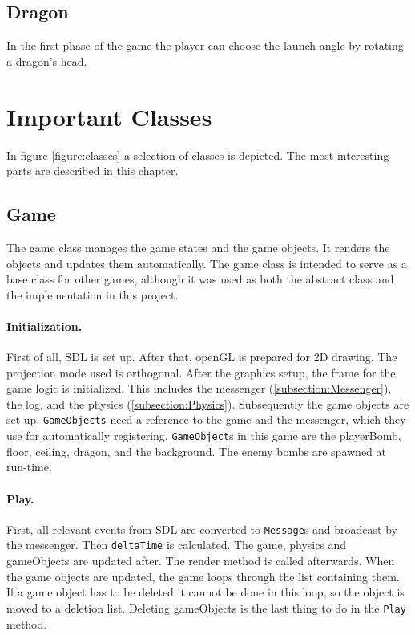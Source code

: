 \documentclass[12pt]{article}
\begin{document}
\subsection{Dragon}

In the first phase of the game the player can choose the launch angle by rotating a dragon's head.

\section{Important Classes}
\label{section:classes}

In figure \ref{figure:classes} a selection of classes is depicted. The most interesting parts are described in this chapter.

\subsection{Game}
\label{subsection:Game}
The game class manages the game states and the game objects. It renders the objects and updates them automatically. The game class is intended to serve as a base class for other games, although it was used as both the abstract class and the implementation in this project.

\paragraph{Initialization.} First of all, SDL is set up. After that, openGL is prepared for 2D drawing. The projection mode used is orthogonal.
After the graphics setup, the frame for the game logic is initialized. This includes the messenger (\ref{subsection:Messenger}), the log, and the physics (\ref{subsection:Physics}).
Subsequently the game objects are set up. \texttt{GameObjects} need a reference to the game and the messenger, which they use for automatically registering. \texttt{GameObject}s in this game are the playerBomb, floor, ceiling, dragon, and the background. The enemy bombs are spawned at run-time.

\paragraph{Play.} First, all relevant events from SDL are converted to \texttt{Message}s and broadcast by the messenger. Then \texttt{deltaTime} is calculated. The game, physics and gameObjects are updated after. The render method is called afterwards. When the game objects are updated, the game loops through the list containing them. If a game object has to be deleted it cannot be done in this loop, so the object is moved to a deletion list. Deleting gameObjects is the last thing to do in the \texttt{Play} method.
\end{document}

